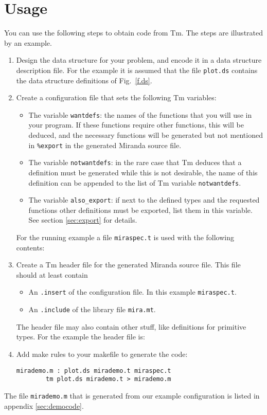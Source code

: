 \documentclass{article}
\def\Tm{{\sf Tm}}
\def\Miranda{Miranda}
\newenvironment{listing}{\small\begin{flushleft}}{\end{flushleft}}
\begin{document}
\section{Usage}
\label{sec:miraquickintro}
You can use the following steps to obtain code from {\Tm}.
The steps are illustrated by an example.
\begin{enumerate}
\item
Design the data structure for your problem,
and encode it in a data structure description file.
For the example it is assumed that the file {\tt plot.ds} contains
the data structure definitions of Fig.~\ref{f.ds}.
\item
Create a configuration file that sets the following {\Tm} variables:
\begin{itemize}
\item
The variable {\tt wantdefs}: the names of the functions that you
will use in your program.
If these functions require other functions,
this will be deduced, and the necessary functions will be generated but
not mentioned in {\tt \%export} in the generated {\Miranda} source file.
\item
\begin{sloppypar}
The variable {\tt notwantdefs}:
in the rare case that {\Tm} deduces that a definition must be generated
while this is not desirable,
the name of this definition can be appended to the list of
{\Tm} variable {\tt notwantdefs}.
\end{sloppypar}
\item
The variable
{\tt also\_export}:
if next to the defined types and the requested functions other definitions
must be exported, list them in this variable.
See section \ref{sec:export} for details.
\end{itemize}
For the running example a file {\tt miraspec.t} is used with the
following contents:
\begin{listing}

\end{listing}
\item
Create a {\Tm} header file for the generated {\Miranda} source file.
This file should at least contain
\begin{itemize}
\item
An {\tt .insert} of the configuration file.
In this example {\tt miraspec.t}.
\item
An {\tt .include} of the library file {\tt mira.mt}.
\end{itemize}
The header file may also contain other stuff,
like definitions for primitive types.
For the example the header file is:
\begin{listing}

\end{listing}
\item
Add make rules to your makefile to generate the code:
\begin{listing}
\begin{verbatim}
mirademo.m : plot.ds mirademo.t miraspec.t
        tm plot.ds mirademo.t > mirademo.m
\end{verbatim}
\end{listing}
\end{enumerate}
\par
The file {\tt mirademo.m} that is generated from our
example configuration is listed
in appendix \ref{sec:democode}.
\end{document}
